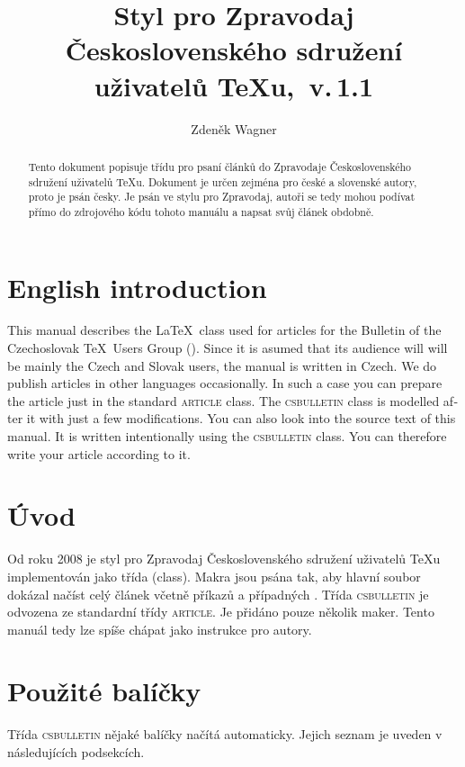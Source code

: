 \documentclass{csbulletin}
\DeclareRobustCommand\version{\unskip~v.\,1.1}
\let\pkg\textsc
\begin{document}
\title{Styl pro Zpravodaj Československého sdružení uživatelů \TeX{}u,\version}
\EnglishTitle{\LaTeX\ Class for \CSTUG\ Bulletin,\version}
\author{Zdeněk Wagner}
\maketitle

\begin{abstract}
Tento dokument popisuje třídu pro psaní článků do Zpravodaje Československého sdružení uživatelů
\TeX{}u. Dokument je určen zejména pro české a slovenské autory, proto je psán česky. Je psán 
ve stylu pro Zpravodaj, autoři se tedy mohou podívat přímo do zdrojového kódu tohoto manuálu a
napsat svůj článek obdobně.
\end{abstract}

\section{English introduction}
\begin{otherlanguage}{english}
This manual describes the \LaTeX\ class used for articles for the Bulletin of the Czechoslovak
\TeX\ Users Group (\cstug). Since it is asumed that its audience will will be mainly the Czech and
Slovak users, the manual is written in Czech. We do publish articles in other languages
occasionally. In such a case you can prepare the article just in the standard \pkg{article} class.
The \pkg{csbulletin} class is modelled after it with just a few modifications. You can also look
into the source text of this manual. It is written intentionally using the \pkg{csbulletin} class.
You can therefore write your article according to it.
\end{otherlanguage}

\section{Úvod}
Od roku 2008 je styl pro Zpravodaj Československého sdružení uživatelů \TeX{}u implementován jako
třída (class). Makra jsou psána tak, aby hlavní soubor dokázal načíst celý článek včetně příkazů
 a případných . Třída \pkg{csbulletin} je odvozena ze standardní
třídy \pkg{article}. Je přidáno pouze několik maker. Tento manuál tedy lze spíše chápat jako
instrukce pro autory.

\section{Použité balíčky}
Třída \pkg{csbulletin} nějaké balíčky načítá automaticky. Jejich seznam je uveden v následujících
podsekcích.
\end{document}
